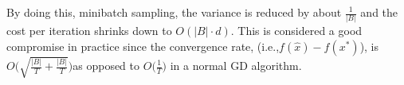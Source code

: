 \documentclass[12pt]{article}
\begin{document}
By doing this, minibatch sampling, the variance is reduced by about $\frac{1}{|B|}$ and the cost per iteration shrinks down to $O(|B|\cdot d)$. This is considered a good compromise in practice since the convergence rate, (i.e.,$f(\hat{x}) -f(x^*)$), is  $O\bigg(\sqrt{\frac{|B|}{T} + \frac{|B|}{T}} \bigg)$as opposed to $O\big(\frac{1}{T} \big)$ in a normal GD algorithm.
\end{document}

